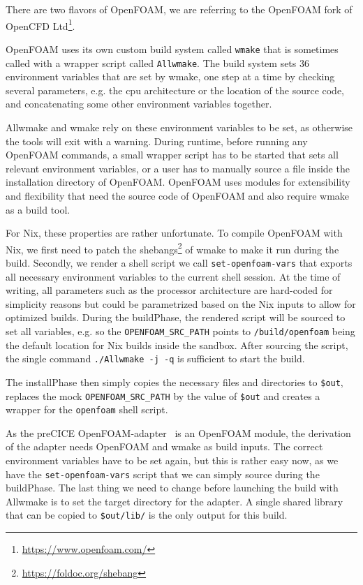 \documentclass{eceasst}
\begin{document}
There are two flavors of OpenFOAM, we are referring to the OpenFOAM fork of OpenCFD Ltd\footnote{\url{https://www.openfoam.com/}}.

OpenFOAM uses its own custom build system called \texttt{wmake} that is sometimes called with a wrapper script called \texttt{Allwmake}.
The build system sets 36 environment variables that are set by wmake, one step at a time by checking several parameters, e.g. the cpu architecture or the location of the source code, and concatenating some other environment variables together.

Allwmake and wmake rely on these environment variables to be set, as otherwise the tools will exit with a warning.
During runtime, before running any OpenFOAM commands, a small wrapper script has to be started that sets all relevant environment variables, or a user has to manually source a file inside the installation directory of OpenFOAM.
OpenFOAM uses modules for extensibility and flexibility that need the source code of OpenFOAM and also require wmake as a build tool.

For Nix, these properties are rather unfortunate.
To compile OpenFOAM with Nix, we first need to patch the shebangs\footnote{\url{https://foldoc.org/shebang}} of wmake to make it run during the build.
Secondly, we render a shell script we call \texttt{set-openfoam-vars} that exports all necessary environment variables to the current shell session.
At the time of writing, all parameters such as the processor architecture are hard-coded for simplicity reasons but could be parametrized based on the Nix inputs to allow for optimized builds.
During the buildPhase, the rendered script will be sourced to set all variables, e.g. so the \texttt{OPENFOAM\_SRC\_PATH} points to \texttt{/build/openfoam} being the default location for Nix builds inside the sandbox.
After sourcing the script, the single command \texttt{./Allwmake -j -q} is sufficient to start the build.

The installPhase then simply copies the necessary files and directories to \texttt{\$out}, replaces the mock \texttt{OPENFOAM\_SRC\_PATH} by the value of \texttt{\$out} and creates a wrapper for the \texttt{openfoam} shell script.

As the preCICE OpenFOAM-adapter~\cite{OpenFOAMpreCICE} is an OpenFOAM module, the derivation of the adapter needs OpenFOAM and wmake as build inputs.
The correct environment variables have to be set again, but this is rather easy now, as we have the \texttt{set-openfoam-vars} script that we can simply source during the buildPhase.
The last thing we need to change before launching the build with Allwmake is to set the target directory for the adapter.
A single shared library that can be copied to \texttt{\$out/lib/} is the only output for this build.
\end{document}
